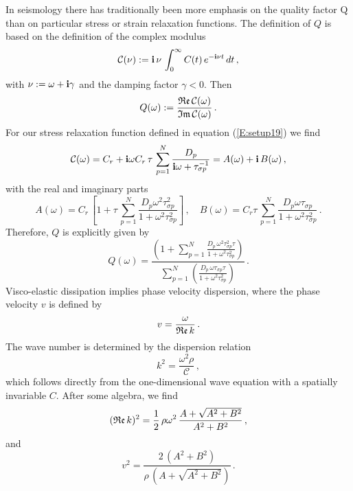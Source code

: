 In seismology there has traditionally been more emphasis on the
quality factor Q than on particular stress or strain relaxation
functions. The definition of $Q$ is based on the definition of the
complex modulus
\begin{equation}\label{E:setup28}
\mathcal{C}(\nu) := \mathbf{i}\,\nu\,\int_{0}^{\infty} C(t)\,e^{-\mathbf{i}\nu
t}\, dt\,,
\end{equation}
with $\nu:=\omega+\mathbf{i}\gamma$ and the damping factor $\gamma<0$. Then
\begin{equation}\label{E:setup29}
Q(\omega) :=
\frac{\frak{Re}\,\mathcal{C}(\omega)}{\frak{Im}\,\mathcal{C}(\omega)}\,.
\end{equation}
For our stress relaxation function defined in equation
(\ref{E:setup19}) we find
\begin{equation}\label{E:setup31a}
\mathcal{C}(\omega)=C_r + \mathbf{i}\omega C_r\,\tau\,\sum_{p=1}^{N} \frac{D_p}{\mathbf{i}\omega + \tau_{\sigma p}^{-1}}=A(\omega)+\mathbf{i}\,B(\omega)\,,
\end{equation}
with the real and imaginary parts
\begin{equation}\label{E:setup31c}
A(\omega)=C_r\,\left[1+\tau\,\sum_{p=1}^{N} \frac{D_p\omega^2 \tau_{\sigma p}^2}{1+\omega^2 \tau_{\sigma p}^2}\right]\,,\quad B(\omega)=C_r\tau\,\sum_{p=1}^{N} \frac{D_p \omega \tau_{\sigma p}}{1+\omega^2 \tau_{\sigma p}^2}\,.
\end{equation}
Therefore, $Q$ is explicitly given by
\begin{equation}\label{E:setup31b}
Q(\omega) = \frac{ \left( 1+ \sum_{p=1}^{N} \frac{D_p\,\omega^2
\tau_{\sigma p}^2\tau}{1+\omega^2 \tau_{\sigma p}^2} \right)}{
\sum_{p=1}^{N} \left( \frac{D_p\,\omega \tau_{\sigma p}
\tau}{1+\omega^2\tau_{\sigma p}^2} \right)}\,.
\end{equation}
Visco-elastic dissipation implies phase velocity dispersion, where the phase velocity $v$ is defined by
\begin{equation}\label{E:setup32}
v=\frac{\omega}{\frak{Re}\,k}\,.
\end{equation}
The wave number is determined by the dispersion relation
\begin{equation}\label{E:setup33}
k^2=\frac{\omega^2 \rho}{\mathcal{C}}\,,
\end{equation}
which follows directly from the one-dimensional wave equation with a spatially invariable $C$. After some algebra, we find
\begin{equation}\label{E:setup34}
(\frak{Re}\,k)^2=\frac{1}{2}\,\rho\omega^2\,\frac{A+\sqrt{A^2+B^2}}{A^2+B^2}\,,
\end{equation}
and
\begin{equation}\label{E:setup35}
v^2=\frac{2\,(A^2+B^2)}{\rho\,(A+\sqrt{A^2+B^2})}\,.
\end{equation}

